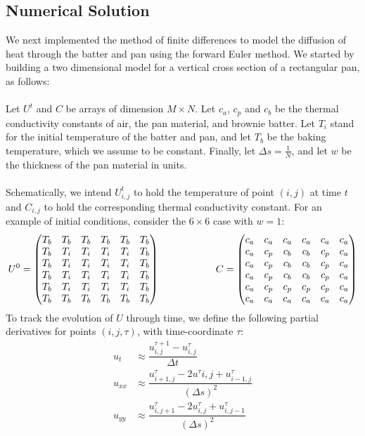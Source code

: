 \documentclass[12pt]{reedmcm}
\begin{document}
\subsection{Numerical Solution}
We next implemented the method of finite differences to model the diffusion of heat through the batter and pan using the forward Euler method.  We started by building a two dimensional model for a vertical cross section of a rectangular pan, as follows:\\
\\
Let $U^t$ and $C$ be arrays of dimension $M \times N$.  Let $c_a$, $c_p$ and $c_b$ be the thermal conductivity constants of air, the pan material, and brownie batter.  Let $T_i$ stand for the initial temperature of the batter and pan, and let $T_b$ be the baking temperature, which we assume to be constant.  Finally, let $\Delta s = \frac{1}{N}$, and let $w$ be the thickness of the pan material in units.\\
\\
Schematically, we intend $U^t_{i,j}$ to hold the temperature of point $(i,j)$ at time $t$ and $C_{i,j}$ to hold the corresponding thermal conductivity constant.  For an example of initial conditions, consider the $6 \times 6$ case with $w = 1$:
\[U^0 = \begin{pmatrix} T_b&T_b&T_b&T_b&T_b&T_b\\
					T_b&T_i &T_i&T_i&T_i&T_b\\
					T_b&T_i &T_i&T_i&T_i&T_b\\
					T_b&T_i &T_i&T_i&T_i&T_b\\
					T_b&T_i &T_i&T_i&T_i&T_b\\
					T_b&T_b&T_b&T_b&T_b&T_b \end{pmatrix} \hspace{20mm}
  C = \begin{pmatrix} c_a&c_a&c_a&c_a&c_a&c_a\\
				   c_a &c_p &c_b&c_b&c_p&c_a\\
				    c_a &c_p &c_b&c_b&c_p&c_a\\
  				 c_a &c_p &c_b&c_b&c_p&c_a\\
				 c_a &c_p &c_p&c_p&c_p&c_a\\
				c_a&c_a&c_a&c_a&c_a&c_a \end{pmatrix} \]		
To track the evolution of $U$ through time, we define the following partial derivatives for points $(i,j,\tau)$, with time-coordinate $\tau$: \begin{align*}
u_t &\approx \dfrac{u_{i,j}^{\tau+1} - u_{i,j}^\tau}{\Delta t}\\
u_{xx} &\approx \dfrac{u_{i+1,j}^\tau - 2u^\tau{i,j} + u_{i-1,j}^\tau}{(\Delta s)^2}\\
u_{yy} &\approx \dfrac{u_{i,j+1}^\tau - 2u_{i,j}^\tau + u_{i,j-1}^\tau}{(\Delta s)^2} \end{align*}
\end{document}

